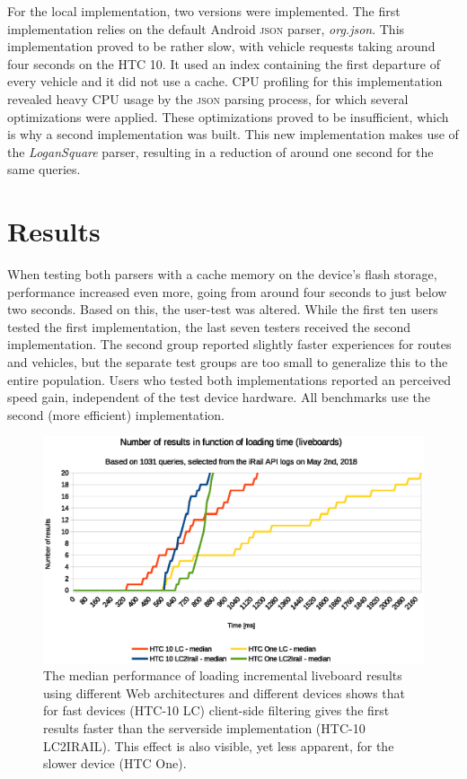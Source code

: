 \documentclass[twocolumn]{phdsymp} %
\begin{document}
For the local implementation, two versions were implemented. The first implementation relies on the default Android \textsc{json} parser, \emph{org.json}. This implementation proved to be rather slow, with vehicle requests taking around four seconds on the HTC 10. It used an index containing the first departure of every vehicle and it did not use a cache. CPU profiling for this implementation revealed heavy CPU usage by the \textsc{json} parsing process, for which several optimizations were applied. These optimizations proved to be insufficient, which is why a second implementation was built. This new implementation makes use of the \emph{LoganSquare} parser, resulting in a reduction of around one second for the same queries.

\section{Results}

When testing both parsers with a cache memory on the device’s flash storage, performance increased even more, going from around four seconds to just below two seconds. Based on this, the user-test was altered. While the first ten users tested the first implementation, the last seven testers received the second implementation. The second group reported slightly faster experiences for routes and vehicles, but the separate test groups are too small to generalize this to the entire population. Users who tested both implementations reported an perceived speed gain, independent of the test device hardware. All benchmarks use the second (more efficient) implementation.


\begin{figure}[ht]
	\begin{center}
		\includegraphics[width=.50\textwidth]{images/dief_liveboards_average.eps}
		\caption{\label{fig:liveboard} The median performance of loading incremental liveboard results using different Web architectures and different devices shows that for fast devices (HTC-10 LC) client-side filtering gives the first results faster than the serverside implementation (HTC-10 LC2IRAIL). This effect is also visible, yet less apparent, for the slower device (HTC One).}
	\end{center}
\end{figure}
\end{document}
